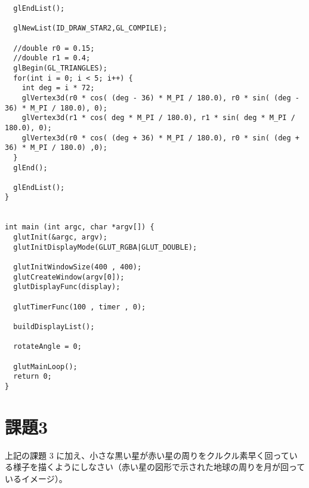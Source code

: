 \documentclass{scrartcl}
\begin{document}
\begin{verbatim}
  glEndList();

  glNewList(ID_DRAW_STAR2,GL_COMPILE);

  //double r0 = 0.15;
  //double r1 = 0.4;
  glBegin(GL_TRIANGLES);
  for(int i = 0; i < 5; i++) {
    int deg = i * 72;
    glVertex3d(r0 * cos( (deg - 36) * M_PI / 180.0), r0 * sin( (deg - 36) * M_PI / 180.0), 0);
    glVertex3d(r1 * cos( deg * M_PI / 180.0), r1 * sin( deg * M_PI / 180.0), 0);
    glVertex3d(r0 * cos( (deg + 36) * M_PI / 180.0), r0 * sin( (deg + 36) * M_PI / 180.0) ,0);
  }
  glEnd();

  glEndList();
}


int main (int argc, char *argv[]) { 
  glutInit(&argc, argv);
  glutInitDisplayMode(GLUT_RGBA|GLUT_DOUBLE);

  glutInitWindowSize(400 , 400);
  glutCreateWindow(argv[0]);
  glutDisplayFunc(display);

  glutTimerFunc(100 , timer , 0);

  buildDisplayList();

  rotateAngle = 0;

  glutMainLoop();
  return 0;
}
\end{verbatim}


\section{課題3}
\label{sec:org01253e8}
上記の課題 3 に加え、小さな黒い星が赤い星の周りをクルクル素早く回っている様子を描くようにしなさい（赤い星の図形で示された地球の周りを月が回っているイメージ）。\\
\end{document}
